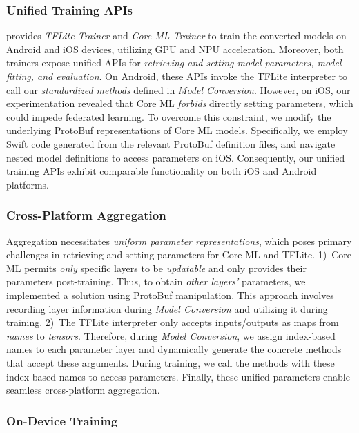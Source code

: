 \subsubsection{Unified Training APIs}
\fedkit provides \textit{TFLite Trainer} and \textit{Core ML Trainer} to
train the converted models on Android and iOS devices,
utilizing GPU and NPU acceleration.
Moreover, both trainers expose unified APIs for
\textit{retrieving and setting model parameters,
    model fitting, and evaluation}.
On Android, these APIs invoke the TFLite interpreter to call
our \textit{standardized methods} defined in \textit{Model Conversion}.
However, on iOS, our experimentation revealed that
Core ML \textit{forbids} directly setting parameters, which could impede federated learning.
To overcome this constraint,
we modify the underlying ProtoBuf representations of
Core ML models.
Specifically,
we employ Swift code generated from the relevant ProtoBuf definition files,
and navigate nested model definitions to access parameters on iOS.
Consequently, our unified training APIs exhibit comparable functionality on
both iOS and Android platforms.

\subsubsection{Cross-Platform Aggregation}
Aggregation necessitates
\textit{uniform parameter representations},
which poses primary challenges in
retrieving and setting parameters for Core ML and TFLite.
1)~Core ML permits \textit{only} specific layers to be \textit{updatable} and
only provides their parameters post-training.
Thus, to obtain \textit{other layers'} parameters,
we implemented a solution using ProtoBuf manipulation.
This approach involves recording layer information
during \textit{Model Conversion} and
utilizing it during training.
2)~The TFLite interpreter only accepts inputs/outputs as maps from
\textit{names} to \textit{tensors}.
Therefore, during \textit{Model Conversion},
we assign index-based names to each parameter layer and
dynamically generate the concrete methods that accept these arguments.
During training, we call the methods with these index-based names to
access parameters.
Finally, these unified parameters enable seamless cross-platform aggregation.

\subsubsection{On-Device Training}

